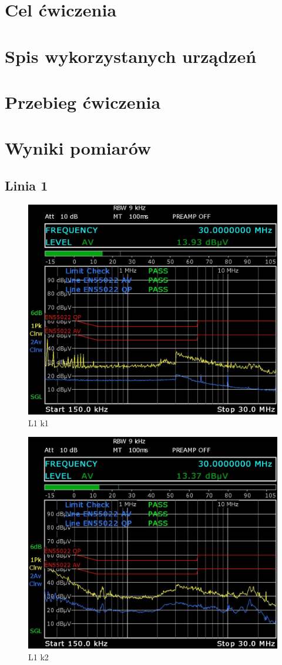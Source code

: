 \documentclass[12pt, a4paper, oneside]{article}
\begin{document}
\section{Cel ćwiczenia}
\section{Spis wykorzystanych urządzeń}
\section{Przebieg ćwiczenia}
\clearpage
\section{Wyniki pomiarów}
\subsection{Linia 1}
\begin{figure}[h]
\centering
\caption{L1 k1}
\includegraphics[scale=0.28]{Linia1/k1.png}
\end{figure}
\begin{figure}[h]
\centering
\caption{L1 k2}
\includegraphics[scale=0.28]{Linia1/k2.png}
\end{figure}
\end{document}
